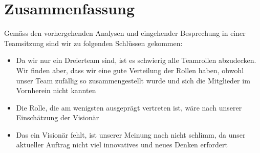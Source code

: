 
\chapter{Zusammenfassung}

Gemäss den vorhergehenden Analysen und eingehender Besprechung in einer Teamsitzung sind wir zu folgenden Schlüssen gekommen:
\begin{itemize}
\item Da wir nur ein Dreierteam sind, ist es schwierig alle Teamrollen abzudecken. Wir finden aber, dass wir eine gute Verteilung der Rollen haben, obwohl unser Team zufällig so zusammengestellt wurde und sich die Mitglieder im Vornherein nicht kannten
\item Die Rolle, die am wenigsten ausgeprägt vertreten ist, wäre nach unserer Einschätzung der Visionär
\item Das ein Visionär fehlt, ist unserer Meinung nach nicht schlimm, da unser aktueller Auftrag nicht viel innovatives und neues Denken erfordert
\end{itemize}